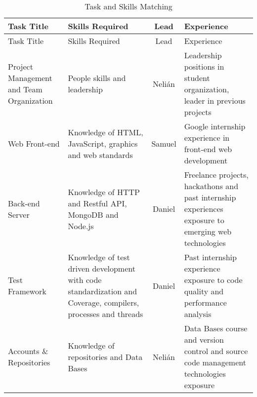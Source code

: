 \label{sec:skills}

\begin{center}
\setlength{\extrarowheight}{1.5pt}
  \begin{longtable}{|m{3cm}|m{5cm}|c|m{5cm}|}
 \caption{Task and Skills Matching} \\
   \hline
  
  \centering Task Title & Skills Required & Lead & Experience \\
  \hline \hline \endfirsthead
  
     \hline

	\centering Task Title & Skills Required & Lead & Experience \\  
	\hline \hline \endhead
  
  \endfoot  
  
  Project Management and Team Organization & People skills and leadership & Nelián & Leadership positions in student organization, leader in previous projects\\ \hline
  Web Front-end & Knowledge of HTML, JavaScript, graphics and web standards & Samuel & Google internship experience in front-end web development\\ \hline
  Back-end Server & Knowledge of HTTP and Restful API, MongoDB and Node.js & Daniel & Freelance projects, hackathons and past internship experiences exposure to emerging web technologies \\ \hline
  Test Framework & Knowledge of test driven development with code standardization and Coverage, compilers, processes and threads & Daniel & Past internship experience exposure to code quality and performance analysis\\ \hline
  Accounts \& Repositories & Knowledge of repositories and Data Bases & Nelián & Data Bases course and version control and source code management
technologies exposure\\ \hline
   \end{longtable}
\end{center}